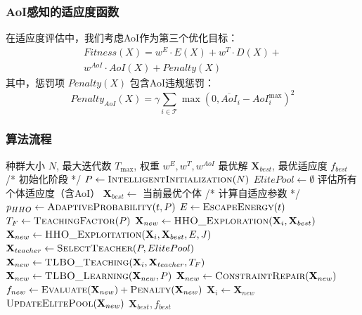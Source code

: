 \documentclass[conference]{IEEEtran}
\begin{document}
\subsubsection{AoI感知的适应度函数}
在适应度评估中，我们考虑AoI作为第三个优化目标：
\begin{equation}
    \begin{split}
        Fitness(X) = w^E \cdot E(X) + w^T \cdot D(X) + \\ 
        w^{AoI} \cdot AoI(X) + Penalty(X)
    \end{split}
\end{equation}
其中，惩罚项 $Penalty(X)$ 包含AoI违规惩罚：
\begin{equation}
Penalty_{AoI}(X) = \gamma \sum_{i \in \mathcal{T}} \max(0, \overline{AoI}_i - AoI_i^{\max})^2
\end{equation}

\subsubsection{算法流程}
\begin{algorithm}[H]
  \caption{TLBO-HHO双阶段集成算法（含AoI优化）}
  \label{alg:tlbo_hho_aoi}
  \begin{algorithmic}[1]
    \REQUIRE 种群大小 $N$, 最大迭代数 $T_{\max}$, 权重 $w^E, w^T, w^{AoI}$
    \ENSURE 最优解 $\mathbf{X}_{best}$, 最优适应度 $f_{best}$
    \STATE /* 初始化阶段 */
    \STATE $P \leftarrow \textsc{IntelligentInitialization}(N)$
    \STATE $ElitePool \leftarrow \emptyset$
    \STATE 评估所有个体适应度（含AoI）
    \STATE $\mathbf{X}_{best} \leftarrow$ 当前最优个体
        \STATE /* 计算自适应参数 */
        \STATE $p_{HHO} \leftarrow \textsc{AdaptiveProbability}(t, P)$
        \STATE $E \leftarrow \textsc{EscapeEnergy}(t)$
        \STATE $T_F \leftarrow \textsc{TeachingFactor}(P)$
                    \STATE $\mathbf{X}_{new} \leftarrow \textsc{HHO\_Exploration}(\mathbf{X}_i, \mathbf{X}_{best})$
                \ELSE
                    \STATE $\mathbf{X}_{new} \leftarrow \textsc{HHO\_Exploitation}(\mathbf{X}_i, \mathbf{X}_{best}, E, J)$
                \ENDIF
            \ELSE
                \STATE $\mathbf{X}_{teacher} \leftarrow \textsc{SelectTeacher}(P, ElitePool)$
                \STATE $\mathbf{X}_{new} \leftarrow \textsc{TLBO\_Teaching}(\mathbf{X}_i, \mathbf{X}_{teacher}, T_F)$
                \STATE $\mathbf{X}_{new} \leftarrow \textsc{TLBO\_Learning}(\mathbf{X}_{new}, P)$
            \ENDIF
            \STATE $\mathbf{X}_{new} \leftarrow \textsc{ConstraintRepair}(\mathbf{X}_{new})$
            \STATE $f_{new} \leftarrow \textsc{Evaluate}(\mathbf{X}_{new}) + \textsc{Penalty}(\mathbf{X}_{new})$
                \STATE $\mathbf{X}_i \leftarrow \mathbf{X}_{new}$
                \STATE $\textsc{UpdateElitePool}(\mathbf{X}_{new})$
            \ENDIF
        \ENDFOR
    \ENDFOR
    \RETURN $\mathbf{X}_{best}, f_{best}$
  \end{algorithmic}
\end{algorithm}
\end{document}
